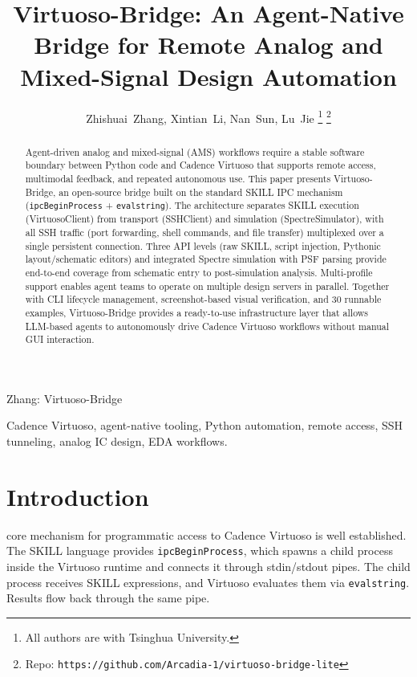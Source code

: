 \documentclass[lettersize,journal]{ieee_template/IEEEtran}
\begin{document}
\title{Virtuoso-Bridge: An Agent-Native Bridge for Remote Analog and Mixed-Signal Design Automation}

\author{Zhishuai~Zhang, Xintian~Li, Nan~Sun, Lu~Jie%
\thanks{All authors are with Tsinghua University.}%
\thanks{Repo: \texttt{https://github.com/Arcadia-1/virtuoso-bridge-lite}}%
}

\markboth{}%
{Zhang: Virtuoso-Bridge}

\maketitle

\begin{abstract}
Agent-driven analog and mixed-signal (AMS) workflows require a stable software boundary between Python code and Cadence Virtuoso that supports remote access, multimodal feedback, and repeated autonomous use. This paper presents Virtuoso-Bridge, an open-source bridge built on the standard SKILL IPC mechanism (\texttt{ipcBeginProcess} + \texttt{evalstring}). The architecture separates SKILL execution (VirtuosoClient) from transport (SSHClient) and simulation (SpectreSimulator), with all SSH traffic (port forwarding, shell commands, and file transfer) multiplexed over a single persistent connection. Three API levels (raw SKILL, script injection, Pythonic layout/schematic editors) and integrated Spectre simulation with PSF parsing provide end-to-end coverage from schematic entry to post-simulation analysis. Multi-profile support enables agent teams to operate on multiple design servers in parallel. Together with CLI lifecycle management, screenshot-based visual verification, and 30 runnable examples, Virtuoso-Bridge provides a ready-to-use infrastructure layer that allows LLM-based agents to autonomously drive Cadence Virtuoso workflows without manual GUI interaction.
\end{abstract}

\begin{IEEEkeywords}
Cadence Virtuoso, agent-native tooling, Python automation, remote access, SSH tunneling, analog IC design, EDA workflows.
\end{IEEEkeywords}

\section{Introduction}
 core mechanism for programmatic access to Cadence Virtuoso is well established. The SKILL language provides \texttt{ipcBeginProcess}, which spawns a child process inside the Virtuoso runtime and connects it through stdin/stdout pipes. The child process receives SKILL expressions, and Virtuoso evaluates them via \texttt{evalstring}. Results flow back through the same pipe.
\end{document}
